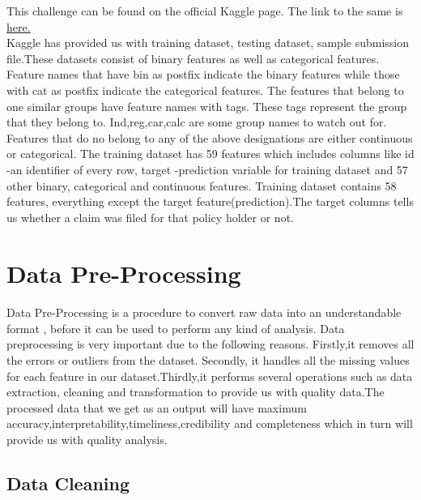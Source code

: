 \documentclass[fleqn,10pt]{SelfArx} %
\begin{document}
This challenge can be found on the official Kaggle page. The link to the same is \href{https://www.kaggle.com/c/porto-seguro-safe-driver-prediction}{here.}\\Kaggle has provided us with training dataset, testing dataset, sample submission file.These datasets consist of binary features as well as categorical features. Feature names  that have bin as postfix indicate the binary features while those with cat as postfix indicate the categorical features. The features that belong to one similar groups have feature names with tags. These tags represent the group that they belong to. Ind,reg,car,calc are some group names to watch out for. Features that do no belong to any of the above designations are either continuous or categorical. The training dataset has 59 features which includes columns like id -an identifier of every row, target -prediction variable for training dataset and 57 other binary, categorical and continuous features. Training dataset contains 58 features, everything except the target feature(prediction).The target columns tells us whether a claim was filed for that policy holder or not.\\   
   

\section{Data Pre-Processing}

\paragraph{} 
Data Pre-Processing is a procedure to convert raw data into an understandable format , before it can be used to perform any kind of analysis. Data preprocessing is very important due to the following reasons. Firstly,it removes all the errors or outliers from the dataset. Secondly, it handles all the missing values for each feature in our dataset.Thirdly,it performs several operations such as data extraction, cleaning and transformation to provide us with quality data.The processed data that we get as an output will have maximum accuracy,interpretability,timeliness,credibility and completeness which in turn will provide us with quality analysis. 

\subsection{Data Cleaning}
\end{document}
